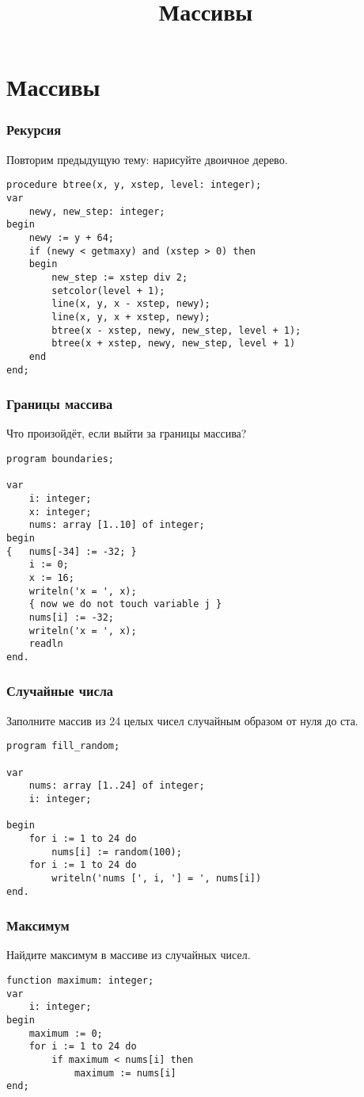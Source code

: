 \documentclass[10,a4paper]{article}
\title{Массивы}
\begin{document}
\section{Массивы}
\subsubsection{Рекурсия}
Повторим предыдущую тему: нарисуйте двоичное дерево.
\begin{lstlisting}
procedure btree(x, y, xstep, level: integer);
var
    newy, new_step: integer;
begin
    newy := y + 64;
    if (newy < getmaxy) and (xstep > 0) then
    begin
        new_step := xstep div 2;
        setcolor(level + 1);
        line(x, y, x - xstep, newy);
        line(x, y, x + xstep, newy);
        btree(x - xstep, newy, new_step, level + 1);
        btree(x + xstep, newy, new_step, level + 1)
    end
end;
\end{lstlisting}
\subsubsection{Границы массива}
Что произойдёт, если выйти за границы массива?
\begin{lstlisting}
program boundaries;

var
    i: integer;
    x: integer;
    nums: array [1..10] of integer;
begin
{   nums[-34] := -32; }
    i := 0;
    x := 16;
    writeln('x = ', x);
    { now we do not touch variable j }
    nums[i] := -32;
    writeln('x = ', x);
    readln
end.
\end{lstlisting}
\subsubsection{Случайные числа}
Заполните массив из 24 целых чисел случайным образом от нуля до ста.
\begin{lstlisting}
program fill_random;

var
    nums: array [1..24] of integer;
    i: integer;

begin
    for i := 1 to 24 do
        nums[i] := random(100);
    for i := 1 to 24 do
        writeln('nums [', i, '] = ', nums[i])
end.
\end{lstlisting}
\subsubsection{Максимум}
Найдите максимум в массиве из случайных чисел.
\begin{lstlisting}
function maximum: integer;
var
    i: integer;
begin
    maximum := 0;
    for i := 1 to 24 do
        if maximum < nums[i] then
            maximum := nums[i]
end;
\end{lstlisting}
\end{document}
